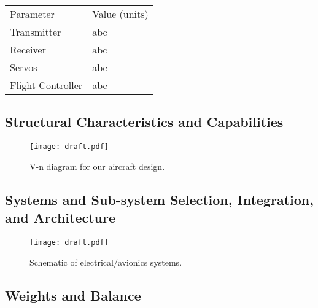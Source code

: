 \begin{table}[h!]
\begin{subtable}[t]{0.3\textwidth}
\begin{tabular}{ C{1.1in} C{0.75in} }
		Parameter & Value (units)  \\

		Transmitter & abc  \\
		Receiver & abc  \\
		Servos & abc  \\
		Flight Controller & abc  \\
	\end{tabular}
\end{subtable}
\end{table}


\subsection{Structural Characteristics and Capabilities}
\label{ssec:structures}


\begin{figure}[h!]
	\centering
	\texttt{[image: draft.pdf]}
	\caption{V-n diagram for our aircraft design.}
	\label{fig:vndiagram}
\end{figure}



\subsection{Systems and Sub-system Selection, Integration, and Architecture}
\label{ssec:systemdetails}

\begin{figure}[h!]
	\centering
	\texttt{[image: draft.pdf]}
	\caption{Schematic of electrical/avionics systems.}
	\label{fig:schematic}
\end{figure}


\subsection{Weights and Balance}
\label{ssec:weightsandbalance}


